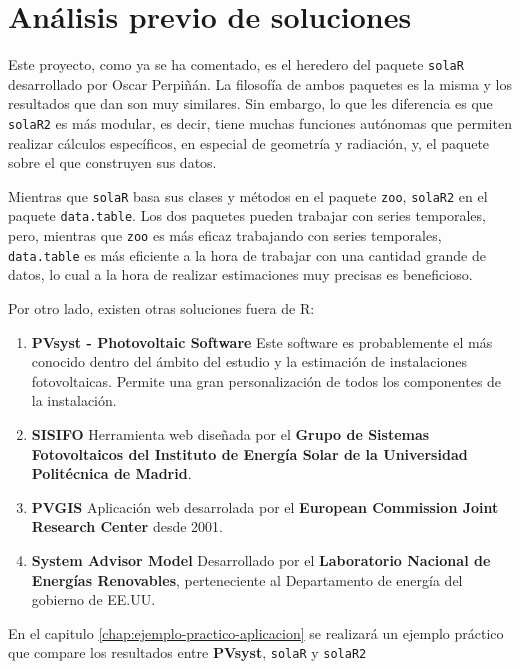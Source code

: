\section{Análisis previo de soluciones}
\label{sec:org855bcec}
Este proyecto, como ya se ha comentado, es el heredero del paquete \texttt{solaR} desarrollado por Oscar Perpiñán. La filosofía de ambos paquetes es la misma y los resultados que dan son muy similares. Sin embargo, lo que les diferencia es que \texttt{solaR2} es más modular, es decir, tiene muchas funciones autónomas que permiten realizar cálculos específicos, en especial de geometría y radiación, y, el paquete sobre el que construyen sus datos.

Mientras que \texttt{solaR} basa sus clases y métodos en el paquete \texttt{zoo}, \texttt{solaR2} en el paquete \texttt{data.table}. Los dos paquetes pueden trabajar con series temporales, pero, mientras que \texttt{zoo} es más eficaz trabajando con series temporales, \texttt{data.table} es más eficiente a la hora de trabajar con una cantidad grande de datos, lo cual a la hora de realizar estimaciones muy precisas es beneficioso.

Por otro lado, existen otras soluciones fuera de R:
\begin{enumerate}
\item \textbf{PVsyst - Photovoltaic Software} \cite{pvsyst}
Este software es probablemente el más conocido dentro del ámbito del estudio y la estimación de instalaciones fotovoltaicas. Permite una gran personalización de todos los componentes de la instalación.
\item \textbf{SISIFO} \cite{sisifo}
Herramienta web diseñada por el \textbf{Grupo de Sistemas Fotovoltaicos del Instituto de Energía Solar de la Universidad Politécnica de Madrid}.
\item \textbf{PVGIS} \cite{pvgis}
Aplicación web desarrolada por el \textbf{European Commission Joint Research Center} desde 2001.
\item \textbf{System Advisor Model} \cite{sam}
Desarrollado por el \textbf{Laboratorio Nacional de Energías Renovables}, perteneciente al Departamento de energía del gobierno de EE.UU.
\end{enumerate}
En el capitulo \ref{chap:ejemplo-practico-aplicacion} se realizará un ejemplo práctico que compare los resultados entre \textbf{PVsyst}, \texttt{solaR} y \texttt{solaR2}
